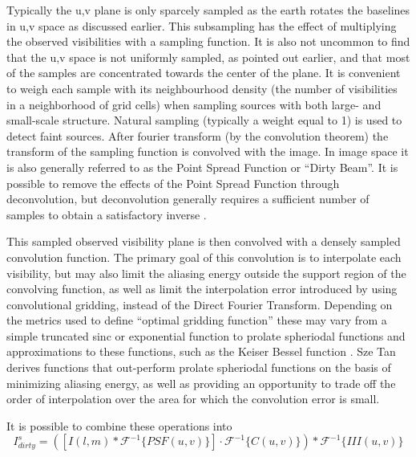  Typically the u,v plane is only sparcely sampled as the earth rotates the baselines in u,v space as discussed earlier. This subsampling has the effect of multiplying the observed visibilities with a sampling function. It is also
 not uncommon to find that the u,v space is not uniformly sampled, as pointed out earlier, and that most of the samples are concentrated towards the center of the plane. It is convenient to weigh each sample with its neighbourhood density 
 (the number of visibilities in a neighborhood of grid cells) when sampling sources with both large- and small-scale structure. Natural sampling (typically a weight equal to 1) is used to detect faint sources. After fourier transform
 (by the convolution theorem) the transform of the sampling function is convolved with the image. In image space it is also generally referred to as the Point Spread Function or ``Dirty Beam''. It is possible to remove
 the effects of the Point Spread Function through deconvolution, but deconvolution generally requires a sufficient number of samples to obtain a satisfactory inverse \cite{taylor1999synthesis}.
 
 This sampled observed visibility plane is then convolved with a densely sampled convolution function. The primary goal of this convolution is to interpolate each visibility, but may also limit the aliasing energy outside the support 
 region of the convolving function, as well as limit the interpolation error introduced by using convolutional gridding, instead of the Direct Fourier Transform. Depending on the metrics used to define ``optimal gridding function'' these may vary from a simple truncated sinc or exponential function 
 \cite[Lecture 7]{taylor1999synthesis} to prolate spheriodal functions and approximations to these functions, such as the Keiser Bessel function \cite{jackson1991selection}. Sze Tan \cite{tan1986aperture} derives functions that out-perform prolate spheriodal functions
 on the basis of minimizing aliasing energy, as well as providing an opportunity to trade off the order of interpolation over the area for which the convolution error is small.
 
 It is possible to combine these operations into 
 \begin{equation*}
  I^s_{dirty} = ([I(l,m)*\mathcal{F}^{-1}\{PSF(u,v)\}]\cdot\mathcal{F}^{-1}\{C(u,v)\}) * \mathcal{F}^{-1}\{III(u,v)\}
 \end{equation*}
